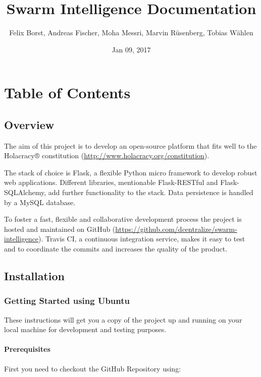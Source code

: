 \documentclass[letterpaper,10pt,english]{sphinxmanual}
\title{Swarm Intelligence Documentation}
\date{Jan 09, 2017}
\author{Felix Borst, Andreas Fischer, Moha Messri, Marvin Rüsenberg, Tobias Wählen}
\begin{document}
\maketitle
\sphinxtableofcontents
{}\label{\detokenize{index::doc}}



\chapter{Table of Contents}
\label{\detokenize{index:table-of-contents}}\label{\detokenize{index:swarm-intelligence-platform}}

\section{Overview}
\label{\detokenize{overview::doc}}\label{\detokenize{overview:overview}}
The aim of this project is to develop an open-source platform that fits well to the Holacracy® constitution (\url{http://www.holacracy.org/constitution}).

The stack of choice is Flask, a flexible Python micro framework to develop robust web applications.  Different libraries, mentionable Flask-RESTful and Flask-SQLAlchemy, add further functionality to the stack. Data persistence is handled by a MySQL database.

To foster a fast, flexible and collaborative development process the project is hosted and maintained on GitHub (\url{https://github.com/dcentralize/swarm-intelligence}). Travis CI, a continuous integration service, makes it easy to test and to coordinate the commits and increases the quality of the product.


\section{Installation}
\label{\detokenize{installation::doc}}\label{\detokenize{installation:installation}}

\subsection{Getting Started using Ubuntu}
\label{\detokenize{installation:getting-started-using-ubuntu}}
These instructions will get you a copy of the project up and running on your local machine for development and testing purposes.


\subsubsection{Prerequisites}
\label{\detokenize{installation:prerequisites}}
First you need to checkout the GitHub Repository using:
\end{document}
